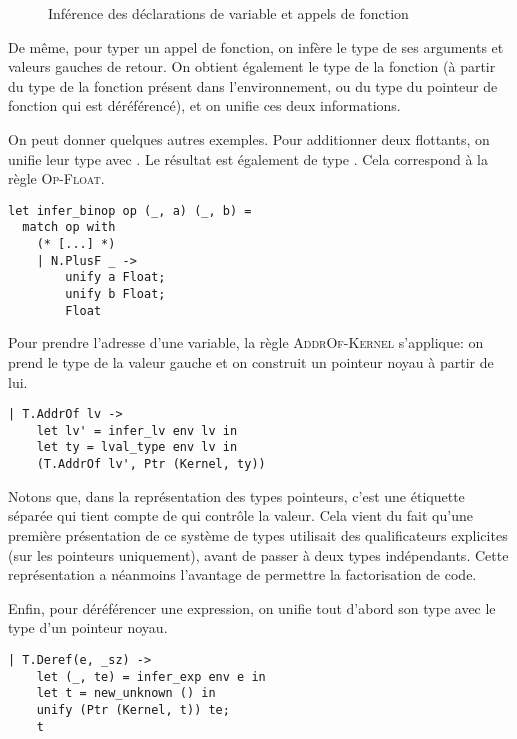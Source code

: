 \begin{figure}[h] %


\caption{Inférence des déclarations de variable et appels de
         fonction}

\label{fig:implem-unif-stmt}
\end{figure}%

De même, pour typer un appel de fonction, on infère le type de ses arguments et
valeurs gauches de retour. On obtient également le type de la fonction (à partir
du type de la fonction présent dans l'environnement, ou du type du pointeur de
fonction qui est déréférencé), et on unifie ces deux informations.

On peut donner quelques autres exemples. Pour additionner deux flottants, on
unifie leur type avec \tFloat. Le résultat est également de type \tFloat. Cela
correspond à la règle \textsc{Op-Float}.

\begin{verbatim}
let infer_binop op (_, a) (_, b) =
  match op with
    (* [...] *)
    | N.PlusF _ ->
        unify a Float;
        unify b Float;
        Float
\end{verbatim}

Pour prendre l'adresse d'une variable, la règle \textsc{AddrOf-Kernel}
s'applique: on prend le type de la valeur gauche et on construit un pointeur
noyau à partir de lui.

\begin{verbatim}
| T.AddrOf lv ->
    let lv' = infer_lv env lv in
    let ty = lval_type env lv in
    (T.AddrOf lv', Ptr (Kernel, ty))
\end{verbatim}

\label{page:qualifs-pas-qualifs}
Notons que, dans la représentation des types pointeurs, c'est une étiquette
séparée qui tient compte de qui contrôle la valeur. Cela vient du fait qu'une
première présentation de ce système de types utilisait des qualificateurs
explicites (sur les pointeurs uniquement), avant de passer à deux types
indépendants. Cette représentation a néanmoins l'avantage de permettre la
factorisation de code.

Enfin, pour déréférencer une expression, on unifie tout d'abord son type avec le
type d'un pointeur noyau.

\begin{verbatim}
| T.Deref(e, _sz) ->
    let (_, te) = infer_exp env e in
    let t = new_unknown () in
    unify (Ptr (Kernel, t)) te;
    t
\end{verbatim}

